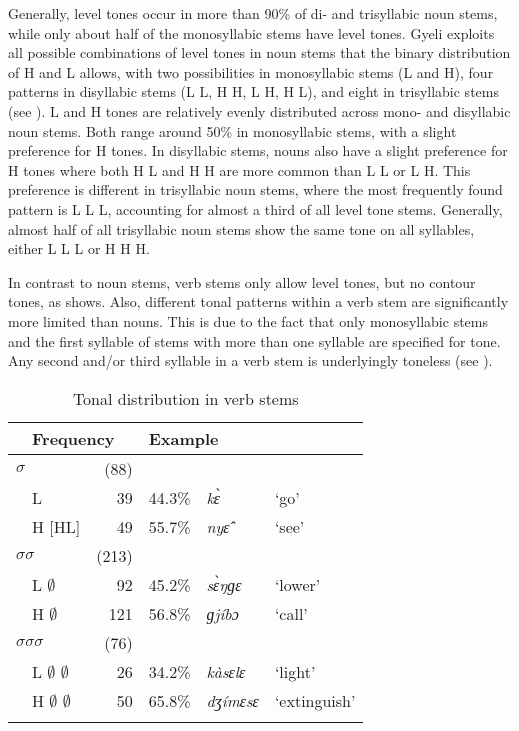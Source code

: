 Generally, level tones occur in more than 90\% of di- and trisyllabic noun stems, while only about half of the monosyllabic stems have level tones.
Gyeli exploits all possible combinations of level tones in noun stems that the binary distribution of H and L allows, with two possibilities in monosyllabic stems (L and H), four patterns in disyllabic stems (L L, H H,  L H, H L), and eight in trisyllabic stems (see ). L and H tones are relatively evenly distributed across mono- and disyllabic noun stems. Both range around 50\% in monosyllabic stems, with a slight preference for H tones. In disyllabic stems, nouns also have a slight preference for H tones where both H L and H H are more common than L L or L H. This preference is different in trisyllabic noun stems, where the most frequently found pattern is L L L, accounting for almost a third of all level tone stems. Generally, almost half of all trisyllabic noun stems show the same tone on all syllables, either L L L or H H H.

In contrast to noun stems, verb stems only allow level tones, but no contour tones, as  shows. Also, different tonal patterns within a verb stem are significantly more limited than nouns. This is due to the fact that  only monosyllabic stems and the first syllable of stems with more than one syllable are specified for tone. Any second and/or third syllable in a verb stem is underlyingly toneless (see ).

\begin{table}
\begin{tabularx}{\textwidth}{lX  rr@{\qquad} ll}
\lsptoprule
\multicolumn{2}{l}{Tonal pattern} & \multicolumn{2}{l}{Frequency} & \multicolumn{2}{l}{Example} \\  \midrule
 \multicolumn{2}{l}{$\sigma$} &  (88) &    & & \\
 & L & 39 & 44.3\% & {\itshape kɛ̀} & `go' \\
 & H [HL] & 49 & 55.7\% & {\itshape nyɛ̂} & `see'  \\
 \midrule
 \multicolumn{2}{l}{$\sigma$$\sigma$} & (213) &  & &  \\
 &  L $\emptyset$ &  92 & 45.2\% & {\itshape sɛ̀ŋɡɛ} & `lower' \\
 & H $\emptyset$ &  121  & 56.8\% & {\itshape ɡjíbɔ} & `call' \\
 \midrule
 \multicolumn{2}{l}{$\sigma$$\sigma$$\sigma$} & (76) &  & &  \\
 & L $\emptyset$ $\emptyset$ &  26  & 34.2\% & {\itshape kàsɛlɛ} & `light' \\
& H $\emptyset$ $\emptyset$ & 50  & 65.8\% & {\itshape dʒímɛsɛ} & `extinguish'  \\  \lspbottomrule
\end{tabularx}
\caption{Tonal distribution in verb stems}
\label{Tab:ToneV}
\end{table} 

